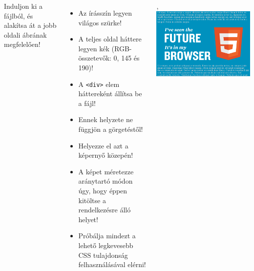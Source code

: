 \begin{frame}
  \begin{columns}[c]
      \footnotesize
      Induljon ki a  
      fájlból, és alakítsa át a jobb oldali ábrának megfelelően!
      \begin{itemize}
        \item Az írásszín legyen világos szürke!
        \item A teljes oldal háttere legyen kék (RGB-összetevők: 0, 
        145 és 190)!
        \item A \texttt{<div>} elem háttereként állítsa be a 
         fájl!
        \item Ennek helyzete ne függjön a görgetéstől!
        \item Helyezze el azt a képernyő közepén!
        \item A képet méretezze aránytartó módon úgy, hogy éppen 
        kitöltse a rendelkezésre álló helyet!
        \item Próbálja mindezt a lehető legkevesebb CSS tulajdonság 
        felhasználásával elérni!
      \end{itemize}
      \begin{exampleblock}{, }
        \includegraphics[width=\textwidth]{rogzites3-mo.png}
      \end{exampleblock}
  \end{columns} 
\end{frame}
